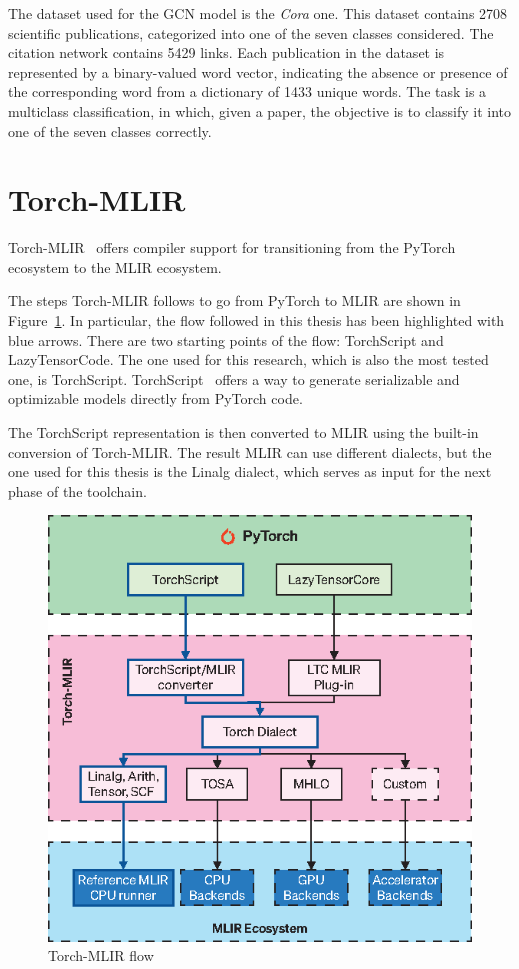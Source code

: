 The dataset used for the GCN model is the \textit{Cora} one.
This dataset contains 2708 scientific publications, categorized into one of the seven classes considered.
The citation network contains 5429 links.
Each publication in the dataset is represented by a binary-valued word vector, indicating the absence or presence of the corresponding word from a dictionary of 1433 unique words.
The task is a multiclass classification, in which, given a paper, the objective is to classify it into one of the seven classes correctly.

\section{Torch-MLIR}
\label{sec:toolchain-torch_mlir}%

Torch-MLIR~\cite{torch_mlir} offers compiler support for transitioning from the PyTorch ecosystem to the MLIR ecosystem.

The steps Torch-MLIR follows to go from PyTorch to MLIR are shown in Figure~\ref{fig:torch-mlir}.
In particular, the flow followed in this thesis has been highlighted with blue arrows.
There are two starting points of the flow: TorchScript and LazyTensorCode.
The one used for this research, which is also the most tested one, is TorchScript.
TorchScript~\cite{torchscript} offers a way to generate serializable and optimizable models directly from PyTorch code.

The TorchScript representation is then converted to MLIR using the built-in conversion of Torch-MLIR. The result MLIR can use different dialects, but the one used for this thesis is the Linalg dialect, which serves as input for the next phase of the toolchain.

\begin{figure}[t]
    \centering
    \includegraphics[height=0.5\textwidth]{Images/torch-mlir}
    \caption{Torch-MLIR flow}
    \label{fig:torch-mlir}
\end{figure}

